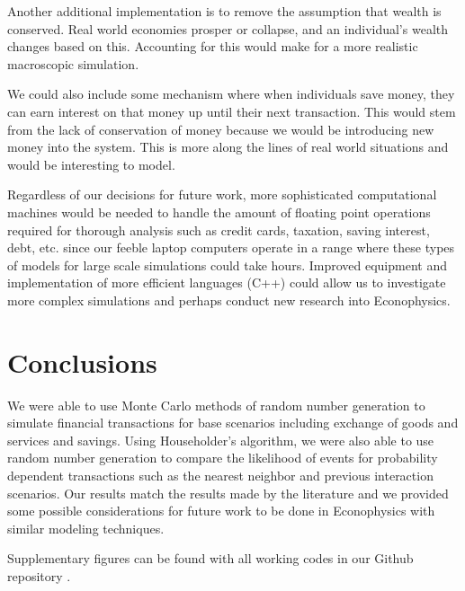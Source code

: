 \documentclass[11pt]{article}
\begin{document}
	Another additional implementation is to remove the assumption that wealth is conserved. Real world economies prosper or collapse, and an individual's wealth changes based on this. Accounting for this would make for a more realistic macroscopic simulation. 
	
	We could also include some mechanism where when individuals save money, they can earn interest on that money up until their next transaction. This would stem from the lack of conservation of money because we would be introducing new money into the system. This is more along the lines of real world situations and would be interesting to model.
	
	Regardless of our decisions for future work, more sophisticated computational machines would be needed to handle the amount of floating point operations required for thorough analysis such as credit cards, taxation, saving interest, debt, etc. since our feeble laptop computers operate in a range where these types of models for large scale simulations could take hours. Improved equipment and implementation of more efficient languages (C++) could allow us to investigate more complex simulations and perhaps conduct new research into Econophysics.
	
	\section{Conclusions}
	We were able to use Monte Carlo methods of random number generation to simulate financial transactions for base scenarios including exchange of goods and services and savings. Using Householder's algorithm, we were also able to use random number generation to compare the likelihood of events for probability dependent transactions such as the nearest neighbor and previous interaction scenarios. Our results match the results made by the literature and we provided some possible considerations for future work to be done in Econophysics with similar modeling techniques.
	
	Supplementary figures can be found with all working codes in our Github repository \cite{github}. 
	
\end{document}
